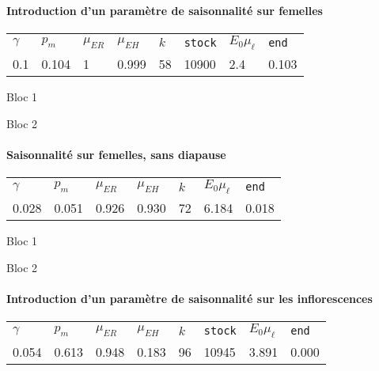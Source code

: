 \documentclass[a4paper, 11pt]{article}
\begin{document}
 
 \clearpage
  \paragraph{Introduction d'un paramètre de saisonnalité sur femelles}
   \begin{center}
\begin{tabular}{llllllll}
$\gamma$ & $p_m$ & $\mu_{ER}$ & $\mu_{EH}$ & $k$ & \texttt{stock} & $E_0 \mu_{\ell}$ & \texttt{end}\\
0.1 & 0.104 & 1 & 0.999 & 58 & 10900 & 2.4 & 0.103
 \end{tabular}
 \end{center}
 
 Bloc 1
  \begin{figure}[ht]
 \centering
{}
\end{figure}
 
 Bloc 2
  \begin{figure}[ht]
 \centering
{}
\end{figure}
 
 
 \clearpage
  \paragraph{Saisonnalité sur femelles, sans diapause}
   \begin{center}
\begin{tabular}{lllllll}
$\gamma$ & $p_m$ & $\mu_{ER}$ & $\mu_{EH}$ & $k$ & $E_0 \mu_{\ell}$ & \texttt{end}\\
0.028 & 0.051 & 0.926 & 0.930 & 72 & 6.184 & 0.018
 \end{tabular}
 \end{center}
 
 Bloc 1
  \begin{figure}[ht]
 \centering
{}
\end{figure}

Bloc 2
  \begin{figure}[ht]
 \centering
{}
\end{figure}

 \clearpage
  \paragraph{Introduction d'un paramètre de saisonnalité sur les inflorescences}
   \begin{center}
\begin{tabular}{llllllll}
$\gamma$ & $p_m$ & $\mu_{ER}$ & $\mu_{EH}$ & $k$ & \texttt{stock} & $E_0 \mu_{\ell}$ & \texttt{end}\\
0.054 & 0.613 & 0.948 & 0.183 & 96 & 10945 & 3.891 & 0.000
 \end{tabular}
 \end{center}
 
\end{document}
